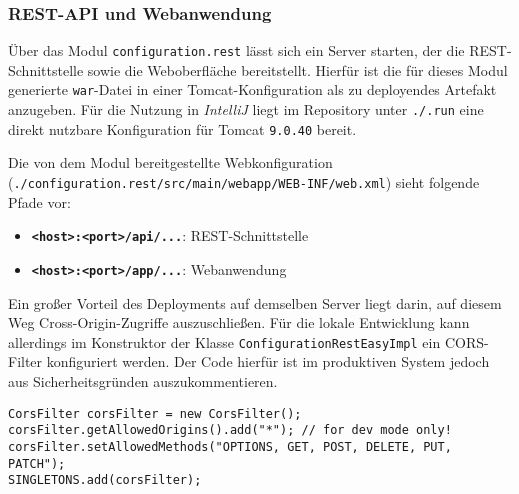 \subsubsection{REST-API und Webanwendung}

Über das Modul \texttt{configuration.rest} lässt sich ein Server starten, der die REST-Schnittstelle sowie die Weboberfläche bereitstellt.
Hierfür ist die für dieses Modul generierte \texttt{war}-Datei in einer Tomcat-Konfiguration als zu deployendes Artefakt anzugeben.
Für die Nutzung in \textit{IntelliJ} liegt im Repository unter \texttt{./.run} eine direkt nutzbare Konfiguration für Tomcat \texttt{9.0.40} bereit.

Die von dem Modul bereitgestellte Webkonfiguration
\linebreak(\texttt{./configuration.rest/src/main/webapp/WEB-INF/web.xml}) sieht folgende Pfade vor:

\begin{itemize}
    \item \textbf{\texttt{<host>:<port>/api/...}}: REST-Schnittstelle
    \item \textbf{\texttt{<host>:<port>/app/...}}: Webanwendung
\end{itemize}

Ein großer Vorteil des Deployments auf demselben Server liegt darin, auf diesem Weg Cross-Origin-Zugriffe auszuschließen.
Für die lokale Entwicklung kann allerdings im Konstruktor der Klasse \texttt{ConfigurationRestEasyImpl} ein CORS-Filter konfiguriert werden.
Der Code hierfür ist im produktiven System jedoch aus Sicherheitsgründen auszukommentieren.

\begin{lstlisting}[label={lst:cors}]
CorsFilter corsFilter = new CorsFilter();
corsFilter.getAllowedOrigins().add("*"); // for dev mode only!
corsFilter.setAllowedMethods("OPTIONS, GET, POST, DELETE, PUT, PATCH");
SINGLETONS.add(corsFilter);
\end{lstlisting}